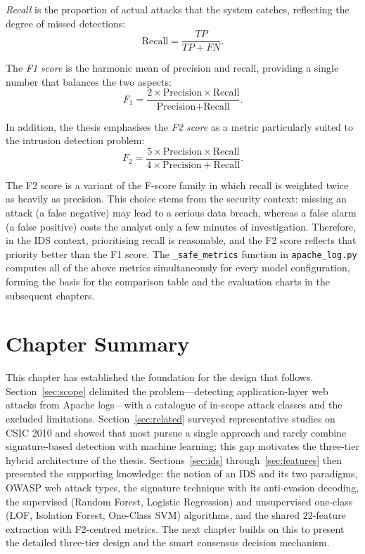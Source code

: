 \documentclass[../main.tex]{subfiles}
\begin{document}
\emph{Recall} is the proportion of actual attacks that the system catches,
reflecting the degree of missed detections:
\begin{equation}
  \text{Recall} = \frac{TP}{TP + FN}.
  \label{eq:recall}
\end{equation}

The \emph{F1 score} is the harmonic mean of precision and recall, providing
a single number that balances the two aspects:
\begin{equation}
  F_1 = \frac{2 \times \text{Precision} \times \text{Recall}}
             {\text{Precision} + \text{Recall}}.
  \label{eq:f1}
\end{equation}

In addition, the thesis emphasises the \emph{F2 score} as a metric
particularly suited to the intrusion detection problem:
\begin{equation}
  F_2 = \frac{5 \times \text{Precision} \times \text{Recall}}
             {4 \times \text{Precision} + \text{Recall}}.
  \label{eq:f2}
\end{equation}

The F2 score is a variant of the F-score family in which recall is weighted
twice as heavily as precision. This choice stems from the security context:
missing an attack (a false negative) may lead to a serious data breach,
whereas a false alarm (a false positive) costs the analyst only a few
minutes of investigation. Therefore, in the IDS context, prioritising
recall is reasonable, and the F2 score reflects that priority better than
the F1 score. The \texttt{\_safe\_metrics} function in
\texttt{apache\_log.py} computes all of the above metrics simultaneously for
every model configuration, forming the basis for the comparison table and
the evaluation charts in the subsequent chapters.

\section{Chapter Summary}
\label{sec:ch2summary}

This chapter has established the foundation for the design that follows.
Section~\ref{sec:scope} delimited the problem---detecting application-layer
web attacks from Apache logs---with a catalogue of in-scope attack classes and
the excluded limitations. Section~\ref{sec:related} surveyed representative
studies on CSIC 2010 and showed that most pursue a single approach and rarely
combine signature-based detection with machine learning; this gap motivates
the three-tier hybrid architecture of the thesis.
Sections~\ref{sec:ids} through~\ref{sec:features} then presented the
supporting knowledge: the notion of an IDS and its two paradigms, OWASP web
attack types, the signature technique with its anti-evasion decoding, the
supervised (Random Forest, Logistic Regression) and unsupervised one-class
(LOF, Isolation Forest, One-Class SVM) algorithms, and the shared
$22$-feature extraction with F2-centred metrics. The next chapter builds on
this to present the detailed three-tier design and the smart consensus
decision mechanism.

\end{document}
